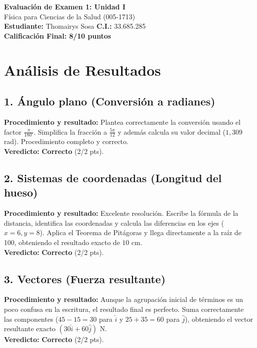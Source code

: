 \documentclass[12pt]{article}
\begin{document}
\begin{center}
    \Large \textbf{Evaluación de Examen 1: Unidad I} \\
    \large Física para Ciencias de la Salud (005-1713) \\
    \vspace{0.5cm}
    \textbf{Estudiante:} Thomairys Sosa \quad \textbf{C.I.:} 33.685.285
    \vspace{0.3cm} \\
    \large \textbf{Calificación Final: 8/10 puntos}
\end{center}

\vspace{0.5cm}

\section*{Análisis de Resultados}

\subsection*{1. Ángulo plano (Conversión a radianes)}
\textbf{Procedimiento y resultado:} Plantea correctamente la conversión usando el factor $\frac{\pi}{180^\circ}$. Simplifica la fracción a $\frac{5\pi}{12}$ y además calcula su valor decimal ($1,309$ rad). Procedimiento completo y correcto. \\
\textbf{Veredicto:} \textbf{Correcto} (2/2 pts).

\subsection*{2. Sistemas de coordenadas (Longitud del hueso)}
\textbf{Procedimiento y resultado:} Excelente resolución. Escribe la fórmula de la distancia, identifica las coordenadas y calcula las diferencias en los ejes ($x=6, y=8$). Aplica el Teorema de Pitágoras y llega directamente a la raíz de 100, obteniendo el resultado exacto de $10$ cm. \\
\textbf{Veredicto:} \textbf{Correcto} (2/2 pts).

\subsection*{3. Vectores (Fuerza resultante)}
\textbf{Procedimiento y resultado:} Aunque la agrupación inicial de términos es un poco confusa en la escritura, el resultado final es perfecto. Suma correctamente las componentes ($45-15=30$ para $\hat{i}$ y $25+35=60$ para $\hat{j}$), obteniendo el vector resultante exacto $(30\hat{i} + 60\hat{j})$ N. \\
\textbf{Veredicto:} \textbf{Correcto} (2/2 pts).
\end{document}
